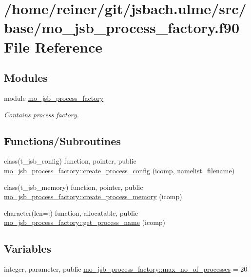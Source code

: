 \hypertarget{mo__jsb__process__factory_8f90}{}\section{/home/reiner/git/jsbach.ulme/src/base/mo\+\_\+jsb\+\_\+process\+\_\+factory.f90 File Reference}
\label{mo__jsb__process__factory_8f90}
\subsection*{Modules}
\begin{DoxyCompactItemize}
\item 
module \hyperlink{namespacemo__jsb__process__factory}{mo\+\_\+jsb\+\_\+process\+\_\+factory}
\begin{DoxyCompactList}\small\item\em Contains process factory. \end{DoxyCompactList}\end{DoxyCompactItemize}
\subsection*{Functions/\+Subroutines}
\begin{DoxyCompactItemize}
\item 
class(t\+\_\+jsb\+\_\+config) function, pointer, public \hyperlink{namespacemo__jsb__process__factory_a6f93cf11896531cdf403cd86d13ab571}{mo\+\_\+jsb\+\_\+process\+\_\+factory\+::create\+\_\+process\+\_\+config} (icomp, namelist\+\_\+filename)
\item 
class(t\+\_\+jsb\+\_\+memory) function, pointer, public \hyperlink{namespacemo__jsb__process__factory_a396024f43415732ae7c3ea7f7b0a053c}{mo\+\_\+jsb\+\_\+process\+\_\+factory\+::create\+\_\+process\+\_\+memory} (icomp)
\item 
character(len=\+:) function, allocatable, public \hyperlink{namespacemo__jsb__process__factory_a84bab7fc767bd4292e70f82de2511d61}{mo\+\_\+jsb\+\_\+process\+\_\+factory\+::get\+\_\+process\+\_\+name} (icomp)
\end{DoxyCompactItemize}
\subsection*{Variables}
\begin{DoxyCompactItemize}
\item 
integer, parameter, public \hyperlink{namespacemo__jsb__process__factory_a337f3a29d18cd060186cd10e4b2a878e}{mo\+\_\+jsb\+\_\+process\+\_\+factory\+::max\+\_\+no\+\_\+of\+\_\+processes} = 20
\end{DoxyCompactItemize}
